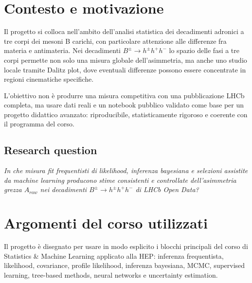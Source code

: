 \documentclass[11pt,a4paper]{article}
\begin{document}
\section{Contesto e motivazione}

Il progetto si colloca nell'ambito dell'analisi statistica dei decadimenti adronici a tre corpi dei mesoni B carichi, con particolare attenzione alle differenze fra materia e antimateria. Nei decadimenti $B^{\pm} \to h^{\pm} h^{+} h^{-}$ lo spazio delle fasi a tre corpi permette non solo una misura globale dell'asimmetria, ma anche uno studio locale tramite Dalitz plot, dove eventuali differenze possono essere concentrate in regioni cinematiche specifiche.

L'obiettivo non è produrre una misura competitiva con una pubblicazione LHCb completa, ma usare dati reali e un notebook pubblico validato come base per un progetto didattico avanzato: riproducibile, statisticamente rigoroso e coerente con il programma del corso.

\subsection*{Research question}
\noindent\emph{In che misura fit frequentisti di likelihood, inferenza bayesiana e selezioni assistite da machine learning producono stime consistenti e controllate dell'asimmetria grezza $A_{raw}$ nei decadimenti $B^{\pm} \to h^{\pm} h^{+} h^{-}$ di LHCb Open Data?}

\section{Argomenti del corso utilizzati}

Il progetto è disegnato per usare in modo esplicito i blocchi principali del corso di Statistics \& Machine Learning applicato alla HEP: inferenza frequentista, likelihood, covariance, profile likelihood, inferenza bayesiana, MCMC, supervised learning, tree-based methods, neural networks e uncertainty estimation.
\end{document}
